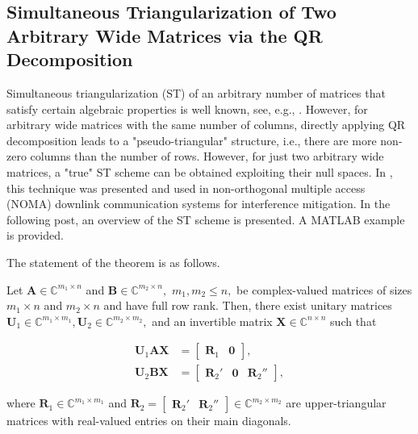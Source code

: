 \subsection{Simultaneous Triangularization of Two Arbitrary Wide Matrices via the QR Decomposition}

Simultaneous triangularization (ST) of an arbitrary number of matrices that satisfy certain algebraic properties is well known, see, e.g., \cite{Radjavi2012}. However, for arbitrary wide matrices with the same number of columns, directly applying QR decomposition leads to a "pseudo-triangular" structure, i.e., there are more non-zero columns than the number of rows. However, for just two arbitrary wide matrices, a "true" ST scheme can be obtained exploiting their null spaces. In \cite{Krishnamoorthy2021}, this technique was presented and used in non-orthogonal multiple access (NOMA) downlink communication systems for interference mitigation. In the following post, an overview of the ST scheme is presented. A MATLAB example is provided.

The statement of the theorem is as follows.

\begin{theorem}
Let $\boldsymbol{A} \in \mathbb{C}^{m_1\times n}$ and $\boldsymbol{B} \in \mathbb{C}^{m_2\times n},$ $m_1,m_2 \leq n,$ be complex-valued matrices of sizes $m_1\times n$ and $m_2\times n$ and have full row rank. Then, there exist unitary matrices $\boldsymbol{U}_1 \in \mathbb{C}^{m_1\times m_1}, \boldsymbol{U}_2 \in \mathbb{C}^{m_2\times m_2},$ and an invertible matrix $\boldsymbol{X} \in \mathbb{C}^{n\times n}$ such that

\begin{align}\boldsymbol{U}_1\boldsymbol{A}\boldsymbol{X} &= \begin{bmatrix}\boldsymbol{R}_1 & \boldsymbol{0}\end{bmatrix}, \label{eqn:std1}\\\boldsymbol{U}_2\boldsymbol{B}\boldsymbol{X} &= \begin{bmatrix}\boldsymbol{R}_2' & \boldsymbol{0} & \boldsymbol{R}_2''\end{bmatrix}, \label{eqn:std2}\end{align}

where $\boldsymbol{R}_1 \in \mathbb{C}^{m_1\times m_1}$ and $\boldsymbol{R}_2 = \begin{bmatrix}\boldsymbol{R}_2'& \boldsymbol{R}_2''\end{bmatrix} \in \mathbb{C}^{m_2\times m_2}$ are upper-triangular matrices with real-valued entries on their main diagonals.
\end{theorem}

